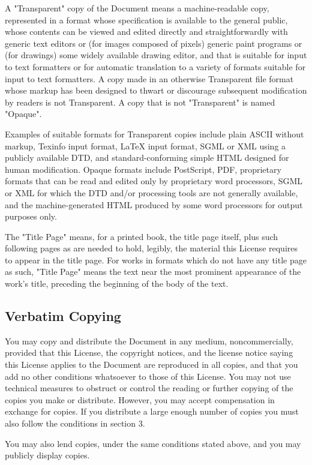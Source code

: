 	A "Transparent" copy of the Document means a machine-readable copy, represented in a format whose specification is available to the general public, whose contents can be viewed and edited directly and straightforwardly with generic text editors or (for images composed of pixels) generic paint programs or (for drawings) some widely available drawing editor, and that is suitable for input to text formatters or for automatic translation to a variety of formats suitable for input to text formatters. A copy made in an otherwise Transparent file format whose markup has been designed to thwart or discourage subsequent modification by readers is not Transparent. A copy that is not "Transparent" is named "Opaque". 

	Examples of suitable formats for Transparent copies include plain ASCII without markup, Texinfo input format, LaTeX input format, SGML or XML using a publicly available DTD, and standard-conforming simple HTML designed for human modification. Opaque formats include PostScript, PDF, proprietary formats that can be read and edited only by proprietary word processors, SGML or XML for which the DTD and/or processing tools are not generally available, and the machine-generated HTML produced by some word processors for output purposes only. 

	The "Title Page" means, for a printed book, the title page itself, plus such following pages as are needed to hold, legibly, the material this License requires to appear in the title page. For works in formats which do not have any title page as such, "Title Page" means the text near the most prominent appearance of the work's title, preceding the beginning of the body of the text. 

	\subsection{Verbatim Copying} 
	You may copy and distribute the Document in any medium, noncommercially, provided that this License, the copyright notices, and the license notice saying this License applies to the Document are reproduced in all copies, and that you add no other conditions whatsoever to those of this License. You may not use technical measures to obstruct or control the reading or further copying of the copies you make or distribute. However, you may accept compensation in exchange for copies. If you distribute a large enough number of copies you must also follow the conditions in section 3. 

	You may also lend copies, under the same conditions stated above, and you may publicly display copies. 

